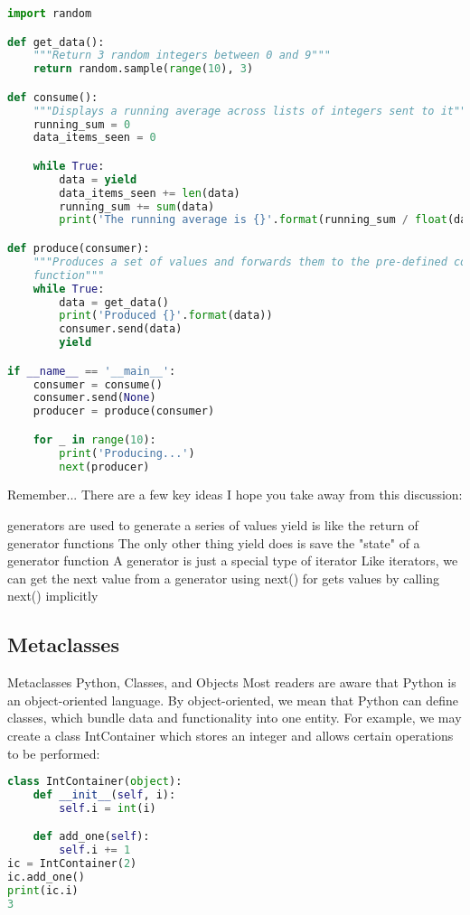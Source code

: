 \begin{lstlisting}[language=Python]
import random

def get_data():
    """Return 3 random integers between 0 and 9"""
    return random.sample(range(10), 3)

def consume():
    """Displays a running average across lists of integers sent to it"""
    running_sum = 0
    data_items_seen = 0

    while True:
        data = yield
        data_items_seen += len(data)
        running_sum += sum(data)
        print('The running average is {}'.format(running_sum / float(data_items_seen)))

def produce(consumer):
    """Produces a set of values and forwards them to the pre-defined consumer
    function"""
    while True:
        data = get_data()
        print('Produced {}'.format(data))
        consumer.send(data)
        yield

if __name__ == '__main__':
    consumer = consume()
    consumer.send(None)
    producer = produce(consumer)

    for _ in range(10):
        print('Producing...')
        next(producer)
\end{lstlisting}

Remember...
There are a few key ideas I hope you take away from this discussion:

generators are used to generate a series of values
yield is like the return of generator functions
The only other thing yield does is save the "state" of a generator function
A generator is just a special type of iterator
Like iterators, we can get the next value from a generator using next()
for gets values by calling next() implicitly

\subsection{Metaclasses}

Metaclasses
Python, Classes, and Objects
Most readers are aware that Python is an object-oriented language. By object-oriented, we mean that Python can define classes, which bundle data and functionality into one entity. For example, we may create a class IntContainer which stores an integer and allows certain operations to be performed:

\begin{lstlisting}[language=Python]
class IntContainer(object):
    def __init__(self, i):
        self.i = int(i)

    def add_one(self):
        self.i += 1
ic = IntContainer(2)
ic.add_one()
print(ic.i)
3
\end{lstlisting}

